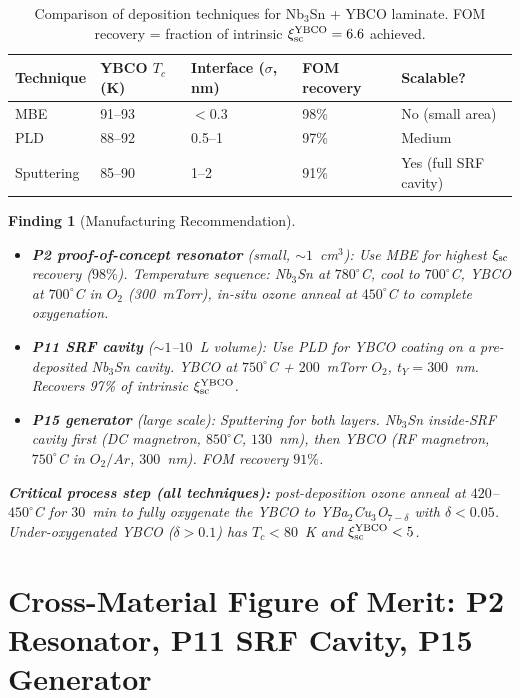 \documentclass[11pt]{article}
\newtheorem{finding}{Finding}
\begin{document}
\begin{table}[h]
\centering
\caption{Comparison of deposition techniques for Nb$_3$Sn + YBCO laminate.
FOM recovery = fraction of intrinsic $\xi_{\rm sc}^{\rm YBCO} = 6.6$ achieved.}
\label{tab:deposition}
\begin{tabular}{lllll}
\toprule
Technique & YBCO $T_c$ (K) & Interface ($\sigma$, nm) & FOM recovery & Scalable? \\
\midrule
MBE & 91--93 & $< 0.3$ & 98\% & No (small area) \\
PLD & 88--92 & 0.5--1 & 97\% & Medium \\
Sputtering & 85--90 & 1--2 & 91\% & Yes (full SRF cavity) \\
\bottomrule
\end{tabular}
\end{table}

\begin{finding}[Manufacturing Recommendation]
\label{finding:manufacturing}
\begin{itemize}
  \item \textbf{P2 proof-of-concept resonator} (small, $\sim 1$~cm$^3$):
        Use MBE for highest $\xi_{\rm sc}$ recovery ($98\%$). Temperature
        sequence: Nb$_3$Sn at $780^\circ$C, cool to $700^\circ$C,
        YBCO at $700^\circ$C in $O_2$ (300~mTorr), in-situ ozone anneal
        at $450^\circ$C to complete oxygenation.
  \item \textbf{P11 SRF cavity} ($\sim 1$--$10$~L volume):
        Use PLD for YBCO coating on a pre-deposited Nb$_3$Sn cavity.
        YBCO at $750^\circ$C + $200$~mTorr $O_2$, $t_Y = 300$~nm.
        Recovers 97\% of intrinsic $\xi_{\rm sc}^{\rm YBCO}$.
  \item \textbf{P15 generator} (large scale):
        Sputtering for both layers. Nb$_3$Sn inside-SRF cavity first
        (DC magnetron, $850^\circ$C, $130$~nm), then YBCO (RF magnetron,
        $750^\circ$C in $O_2/Ar$, $300$~nm). FOM recovery $91\%$.
\end{itemize}

\textbf{Critical process step (all techniques):} post-deposition ozone
anneal at $420$--$450^\circ$C for $30$~min to fully oxygenate the YBCO
to YBa$_2$Cu$_3$O$_{7-\delta}$ with $\delta < 0.05$. Under-oxygenated
YBCO ($\delta > 0.1$) has $T_c < 80$~K and $\xi_{\rm sc}^{\rm YBCO} < 5$.
\end{finding}

\section{Cross-Material Figure of Merit: P2 Resonator, P11 SRF Cavity, P15 Generator}
\label{sec:FOM}
\end{document}
